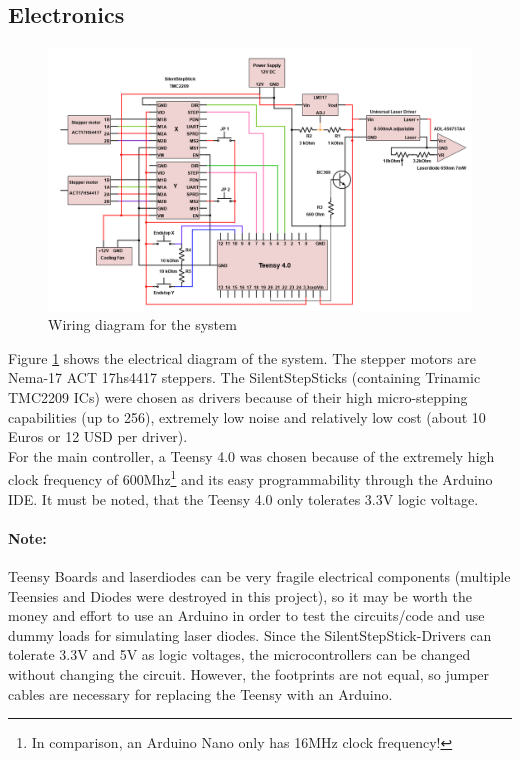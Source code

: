 \documentclass[a4paper, 11pt]{scrartcl}
\begin{document}
\subsection{Electronics}
\begin{figure}[H]
\begin{center}
\includegraphics[width=15cm]{img/electronics.png}
\caption{Wiring diagram for the system}
\label{electronics}
\end{center}
\end{figure}
Figure \ref{electronics} shows the electrical diagram of the system. The stepper motors are Nema-17 ACT 17hs4417 steppers. The SilentStepSticks (containing Trinamic TMC2209 ICs)  were chosen as drivers because of their high micro-stepping capabilities (up to 256), extremely low noise and relatively low cost (about 10 Euros or 12 USD per driver). \\
For the main controller, a Teensy 4.0 was chosen because of the extremely high clock frequency of 600Mhz\footnote{In comparison, an Arduino Nano only has 16MHz clock frequency!} and its easy programmability through the Arduino IDE. It must be noted, that the Teensy 4.0 only tolerates 3.3V logic voltage. 

\paragraph{Note:} Teensy Boards and laserdiodes can be very fragile electrical components (multiple Teensies and Diodes were destroyed in this project), so it may be worth the money and effort to use an Arduino in order to test the circuits/code and use dummy loads for simulating laser diodes. Since the SilentStepStick-Drivers can tolerate 3.3V and 5V as logic voltages, the microcontrollers can be changed without changing the circuit. However, the footprints are not equal, so jumper cables are necessary for replacing the Teensy with an Arduino. \\
\end{document}
